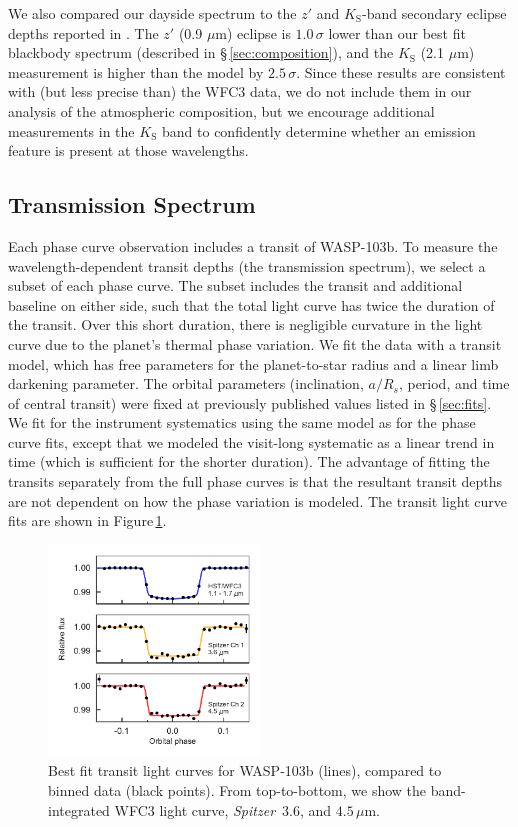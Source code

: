 \documentclass[twocolumn, trackchanges]{aastex61}
\newcommand{\project}[1]{\textsl{#1}}
\newcommand{\Spitzer}{\project{Spitzer}}
\begin{document}

We also compared our dayside spectrum to the $z'$ and $K_\mathrm{S}$-band secondary eclipse depths reported in \cite{delrez18}. The $z'$ (0.9 $\mu$m) eclipse is $1.0\,\sigma$ lower than our best fit blackbody spectrum (described in \S\,\ref{sec:composition}), and the $K_\mathrm{S}$ (2.1 $\mu$m) measurement is higher than the model by $2.5\,\sigma$. Since these results are consistent with (but less precise than) the WFC3 data, we do not include them in our analysis of the atmospheric composition, but we encourage additional measurements in the $K_\mathrm{S}$ band to confidently determine whether an emission feature is present at those wavelengths.

\subsection{Transmission Spectrum}
Each phase curve observation includes a transit of WASP-103b. To measure the
wavelength-dependent transit depths (the transmission spectrum), we select a
subset of each phase curve. The subset includes the transit and additional
baseline on either side, such that the total light curve has twice the duration
of the transit. Over this short duration, there is negligible curvature in the
light curve due to the planet's thermal phase variation. We fit the data with a
transit model, which has free parameters for the planet-to-star radius and a
linear limb darkening parameter. The orbital parameters (inclination, $a/R_s$,
period, and time of central transit) were fixed at previously published values
listed in \S\,\ref{sec:fits}. We fit for the instrument systematics using the
same model as for the phase curve fits, except that we modeled the visit-long
systematic as a linear trend in time (which is sufficient for the shorter
duration). The advantage of fitting the transits separately from the full phase
curves is that the resultant transit depths are not dependent on how the phase
variation is modeled. The transit light curve fits are shown in
Figure\,\ref{fig:transitlc}.

\begin{figure}
\includegraphics[width = 0.5\textwidth]{fig9.pdf}
\caption{Best fit transit light curves for WASP-103b (lines), compared to binned data (black points). From top-to-bottom, we show the band-integrated WFC3 light curve, \Spitzer\ 3.6, and $4.5\,\mu$m.}
\label{fig:transitlc}
\end{figure}
\end{document}

